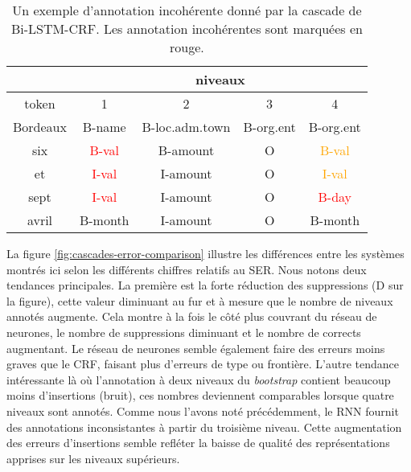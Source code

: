 \documentclass[PhD-Yoann-Dupont.tex]{subfiles}
\begin{document}
\begin{table}[ht!]
\centering
\begin{tabular}{|c|c|c|c|c|}
\cline{2-5}
\multicolumn{1}{c}{} & \multicolumn{4}{|c|}{niveaux} \\
\hline
token & 1 & 2 & 3 & 4 \\
\hline
Bordeaux & B-name & B-loc.adm.town & B-org.ent & B-org.ent \\
six & \textcolor{red}{B-val} & B-amount & O & \textcolor{orange}{B-val} \\
et & \textcolor{red}{I-val} & I-amount & O & \textcolor{orange}{I-val} \\
sept & \textcolor{red}{I-val} & I-amount & O & \textcolor{red}{B-day} \\
avril & B-month & I-amount & O & B-month \\
\hline
\end{tabular}
\caption{Un exemple d'annotation incohérente donné par la cascade de Bi-LSTM-CRF. Les annotation incohérentes sont marquées en rouge.}
\label{tab:incoherent-annotation}
\end{table}

La figure \ref{fig:cascades-error-comparison} illustre les différences entre les systèmes montrés ici selon les différents chiffres relatifs au SER. Nous notons deux tendances principales. La première est la forte réduction des suppressions (D sur la figure), cette valeur diminuant au fur et à mesure que le nombre de niveaux annotés augmente. Cela montre à la fois le côté plus couvrant du réseau de neurones, le nombre de suppressions diminuant et le nombre de corrects augmentant. Le réseau de neurones semble également faire des erreurs moins graves que le CRF, faisant plus d'erreurs de type ou frontière. L'autre tendance intéressante là où l'annotation à deux niveaux du \textit{bootstrap} contient beaucoup moins d'insertions (bruit), ces nombres deviennent comparables lorsque quatre niveaux sont annotés. Comme nous l'avons noté précédemment, le RNN fournit des annotations inconsistantes à partir du troisième niveau. Cette augmentation des erreurs d'insertions semble refléter la baisse de qualité des représentations apprises sur les niveaux supérieurs.
\end{document}
